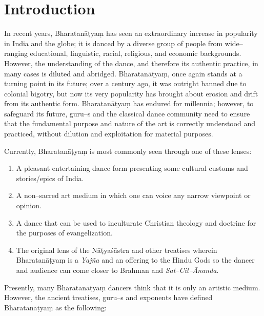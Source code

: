 \section*{Introduction}

In recent years, Bharatanāṭyaṃ has seen an extraordinary increase in popularity in India and the globe; it is danced by a diverse group of people from wide–ranging educational, linguistic, racial, religious, and economic backgrounds. However, the understanding of the dance, and therefore its authentic practice, in many cases is diluted and abridged. Bharatanāṭyaṃ, once again stands at a turning point in its future; over a century ago, it was outright banned due to colonial bigotry, but now its very popularity has brought about erosion and drift from its authentic form. Bharatanāṭyaṃ has endured for millennia; however, to safeguard its future, guru–s and the classical dance community need to ensure that the fundamental purpose and nature of the art is correctly understood and practiced, without dilution and exploitation for material purposes.

Currently, Bharatanāṭyaṃ is most commonly seen through one of these lenses:

\begin{enumerate}[{\rm 1)}]
\itemsep=0pt
\item A pleasant entertaining dance form presenting some cultural customs and stories/epics of India.

 \item A non–sacred art medium in which one can voice any narrow viewpoint or opinion.

 \item A dance that can be used to inculturate Christian theology and doctrine for the purposes of evangelization. 

 \item The original lens of the Nāṭyaśāstra and other treatises wherein Bharatanāṭyaṃ is a \textit{Yajña} and an offering to the Hindu Gods so the dancer and audience can come closer to Brahman and \textit{Sat–Cit–Ānanda}.

\end{enumerate}

Presently, many Bharatanāṭyaṃ dancers think that it is only an artistic medium. However, the ancient treatises, guru–s and exponents have defined Bharatanāṭyaṃ as the following:

